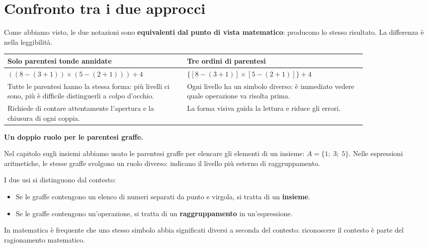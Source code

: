 \section{Confronto tra i due approcci}

Come abbiamo visto, le due notazioni sono \textbf{equivalenti dal punto di
    vista matematico}: producono lo stesso risultato. La differenza è nella
leggibilità.

\begin{center}
    \begin{tabular}{p{0.42\linewidth} p{0.42\linewidth}}
        \toprule
        \textbf{Solo parentesi tonde annidate}                                    & \textbf{Tre ordini di parentesi} \\
        \midrule
        $((8-(3+1))\times(5-(2+1)))+4$                                            &
        $\{[8-(3+1)]\times[5-(2+1)]\}+4$                                                                             \\[4pt]
        Tutte le parentesi hanno la stessa forma: più livelli ci sono,
        più è difficile distinguerli a colpo d'occhio.                            &
        Ogni livello ha un simbolo diverso: è immediato vedere quale operazione
        va risolta prima.                                                                                            \\[4pt]
        Richiede di contare attentamente l'apertura e la chiusura di ogni coppia. &
        La forma visiva guida la lettura e riduce gli errori.                                                        \\
        \bottomrule
    \end{tabular}
\end{center}

\begin{sapevi}
    \textbf{Un doppio ruolo per le parentesi graffe.}

    Nel capitolo sugli insiemi abbiamo usato le parentesi graffe per elencare
    gli elementi di un insieme: $A = \{1;\; 3;\; 5\}$.
    Nelle espressioni aritmetiche, le stesse graffe svolgono un ruolo diverso:
    indicano il livello più esterno di raggruppamento.

    I due usi si distinguono dal contesto:
    \begin{itemize}[leftmargin=1.5em]
        \item Se le graffe contengono un elenco di numeri separati da punto e
              virgola, si tratta di un \textbf{insieme}.
        \item Se le graffe contengono un'operazione, si tratta di un
              \textbf{raggruppamento} in un'espressione.
    \end{itemize}
    In matematica è frequente che uno stesso simbolo abbia significati diversi
    a seconda del contesto: riconoscere il contesto è parte del ragionamento
    matematico.
\end{sapevi}

